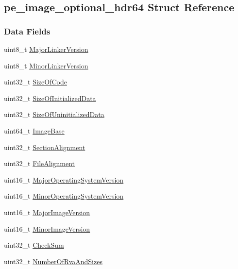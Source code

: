 \hypertarget{structpe__image__optional__hdr64}{\subsection{pe\-\_\-image\-\_\-optional\-\_\-hdr64 Struct Reference}
\label{structpe__image__optional__hdr64}
}
\subsubsection*{Data Fields}
\begin{DoxyCompactItemize}
\item 
uint8\-\_\-t \hyperlink{structpe__image__optional__hdr64_a9fe20c528b23d8a85a250c33c761b840}{Major\-Linker\-Version}
\item 
uint8\-\_\-t \hyperlink{structpe__image__optional__hdr64_a0cc5019694053488b343a458fbc0b657}{Minor\-Linker\-Version}
\item 
uint32\-\_\-t \hyperlink{structpe__image__optional__hdr64_abee9ed2d772fb9bec9f70e22d8f85c23}{Size\-Of\-Code}
\item 
uint32\-\_\-t \hyperlink{structpe__image__optional__hdr64_a042c05a92b0c90acf2e1ee4672857153}{Size\-Of\-Initialized\-Data}
\item 
uint32\-\_\-t \hyperlink{structpe__image__optional__hdr64_aa82afa1757a8a7b76df97b35b4afea84}{Size\-Of\-Uninitialized\-Data}
\item 
uint64\-\_\-t \hyperlink{structpe__image__optional__hdr64_af8df9953c8c190fdb02a4319088284c3}{Image\-Base}
\item 
uint32\-\_\-t \hyperlink{structpe__image__optional__hdr64_ae19363fc9558f4fe8d710789d031f9ac}{Section\-Alignment}
\item 
uint32\-\_\-t \hyperlink{structpe__image__optional__hdr64_a52c4f3c684bea4212e4fb8289794eb0d}{File\-Alignment}
\item 
uint16\-\_\-t \hyperlink{structpe__image__optional__hdr64_a47b3939102eef106f0fc4d6a96c3ad14}{Major\-Operating\-System\-Version}
\item 
uint16\-\_\-t \hyperlink{structpe__image__optional__hdr64_a8eb1d37329b3c54e63e8eb7832e30ba7}{Minor\-Operating\-System\-Version}
\item 
uint16\-\_\-t \hyperlink{structpe__image__optional__hdr64_a2902b4670e5eab8fcc2dc47c7fca868b}{Major\-Image\-Version}
\item 
uint16\-\_\-t \hyperlink{structpe__image__optional__hdr64_a7b61bcb8b63930c239079916325ae734}{Minor\-Image\-Version}
\item 
uint32\-\_\-t \hyperlink{structpe__image__optional__hdr64_ab09f6da5ce2f33ac63606127b1bb2760}{Check\-Sum}
\item 
uint32\-\_\-t \hyperlink{structpe__image__optional__hdr64_a51e6fb2cbc64a53b2bb577f2dd2f677f}{Number\-Of\-Rva\-And\-Sizes}
\end{DoxyCompactItemize}


